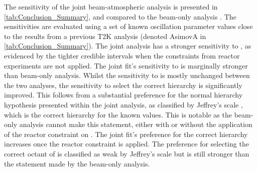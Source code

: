 
The sensitivity of the joint beam-atmospheric analysis is presented in \autoref{tab:Conclusion_Summary}, and compared to the beam-only analysis \cite{Dunne2020-uf}. The sensitivities are evaluated using a set of known oscillation parameter values close to the results from a previous T2K analysis \cite{PhysRevLett.112.181801} (denoted AsimovA in \autoref{tab:Conclusion_Summary}). The joint analysis has a stronger sensitivity to , as evidenced by the tighter \quickmath{1\sigma} credible intervals when the constraints from reactor experiments are not applied. The joint fit's sensitivity to  is marginally stronger than beam-only analysis.
Whilst the sensitivity to  is mostly unchanged between the two analyses, the sensitivity to select the correct hierarchy is significantly improved. This follows from a substantial preference for the normal hierarchy hypothesis presented within the joint analysis, as classified by Jeffrey's scale \cite{Jeffreys:1939xee}, which is the correct hierarchy for the known values. This is notable as the beam-only analysis cannot make this statement, either with or without the application of the reactor constraint on . The joint fit's preference for the correct hierarchy increases once the reactor constraint is applied. The preference for selecting the correct octant of  is classified as weak by Jeffrey's scale but is still stronger than the statement made by the beam-only analysis.

